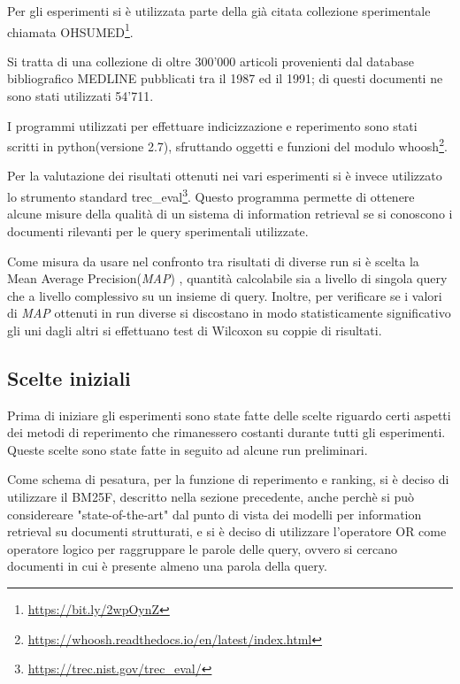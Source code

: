 \documentclass[runningheads]{llncs}
\begin{document}
Per gli esperimenti si \`e utilizzata parte della gi\`a citata collezione sperimentale chiamata OHSUMED\footnote{ \url{https://bit.ly/2wpOynZ}}.

Si tratta di una collezione di oltre 300'000 articoli provenienti dal database bibliografico MEDLINE pubblicati tra il 1987 ed il 1991; di questi documenti ne sono stati utilizzati 54'711.

I programmi utilizzati per effettuare indicizzazione e reperimento sono stati scritti in python(versione 2.7), sfruttando oggetti e funzioni del modulo whoosh\footnote{ \url{https://whoosh.readthedocs.io/en/latest/index.html}}.

Per la valutazione dei risultati ottenuti nei vari esperimenti si \`e invece utilizzato lo strumento standard trec\_eval\footnote{ \url{https://trec.nist.gov/trec\_eval/}}.
Questo programma permette di ottenere alcune misure della qualit\`a di un sistema di information retrieval se si conoscono i documenti rilevanti per le query sperimentali utilizzate.

Come misura da usare nel confronto tra risultati di diverse run si \`e scelta la Mean Average Precision(\textit{MAP})\cite{WBC_map} , quantit\`a calcolabile sia a livello di singola query che a livello complessivo su un insieme di query.
Inoltre, per verificare se i valori di \textit{MAP} ottenuti in run diverse si discostano in modo statisticamente significativo gli uni dagli altri si effettuano test di Wilcoxon\cite{WBC_Will} su coppie di risultati. \par

\subsection{Scelte iniziali}

Prima di iniziare gli esperimenti sono state fatte delle scelte riguardo certi aspetti dei metodi di reperimento che rimanessero costanti durante tutti gli esperimenti.
Queste scelte sono state fatte in seguito ad alcune run preliminari.

Come schema di pesatura, per la funzione di reperimento e ranking,  si \`e deciso di utilizzare il BM25F, descritto nella sezione precedente, anche perch\`e si pu\`o considereare "state-of-the-art" dal punto di vista dei modelli per information retrieval su documenti strutturati, e si \`e deciso di utilizzare l'operatore OR come operatore logico per raggruppare le parole delle query, ovvero si cercano documenti in cui \`e presente almeno una parola della query.
\end{document}
